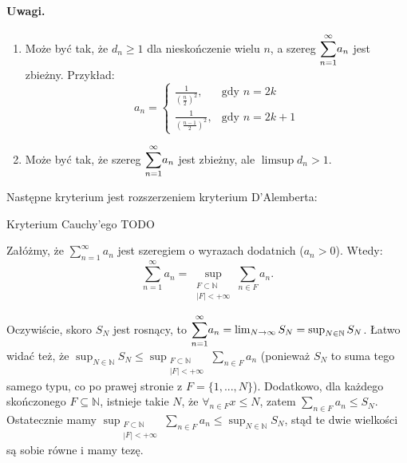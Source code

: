 \documentclass{article}
\numberwithin{defi}{section}
\numberwithin{defi}{section}
\newcommand{\N}{\mathbb{N}}
\newcommand{\oo}{\infty}
\newcommand{\se}{\subseteq}
\renewcommand{\geq}{\geqslant}
\renewcommand{\leq}{\leqslant}
\newcommand{\bsum}[2]{\mathlarger{\sum_{#1}^{#2}}}
\newcommand{\szerI}[1]{\bsum{n=1}{\oo} #1_n}
\newcommand{\gras}[2]{\lim_{#1 \to \oo} #2_{#1}}
\begin{document}
\paragraph{Uwagi.} \begin{enumerate}
    \item Może być tak, że $d_n \geq 1$ dla nieskończenie wielu $n$, a szereg $\szerI{a}$ jest zbieżny. Przykład: \begin{equation*}
        a_n = \begin{cases}
            \frac{1}{(\frac{n}{2})^2}, & \text{gdy } n  = 2k \\
            \frac{1}{(\frac{n-1}{2})^2}, &\text{gdy } n = 2k+ 1
        \end{cases}
    \end{equation*}
    \item Może być tak, że szereg $\szerI{a}$ jest zbieżny, ale $\limsup d_n > 1$. 
\end{enumerate}


Następne kryterium jest rozszerzeniem kryterium D'Alemberta: 
\begin{twier}[label=twier:kryt-Cauchy]{Kryterium Cauchy'ego}
TODO
    
\end{twier}


\begin{twier}{}
    Załóżmy, że $\sum_{n=1}^{\infty} a_n$ jest szeregiem o wyrazach dodatnich ($a_n > 0$). Wtedy:
    \begin{equation}
        \sum\limits_{n=1}^{\infty} a_n = \sup_{\substack{F \subset \N \\ |F| < +\infty}} \sum_{n \in F} a_n.
    \end{equation}
\end{twier}

\begin{dow}
    Oczywiście, skoro $S_N$ jest rosnący, to $\szerI{a} = \gras{N}{S} = \sup_{N \in \N} S_N$. Łatwo widać też, że $\sup_{N \in \N} S_N \leq \sup_{\substack{F \subset \N \\ |F| < +\infty}} \sum_{n \in F} a_n$ (ponieważ $S_N$ to suma tego samego typu, co po prawej stronie z $F = \{1, ..., N\}$). Dodatkowo, dla każdego skończonego $F \se \N$, istnieje takie $N$, że $\forall_{n \in F} x \leq N$, zatem $\sum_{n \in F} a_n \leq S_N$. Ostatecznie mamy $ \sup_{\substack{F \subset \N \\ |F| < +\infty}} \sum_{n \in F} a_n \leq \sup_{N \in \N} S_N$, stąd te dwie wielkości są sobie równe i mamy tezę.
\end{dow}
\end{document}
